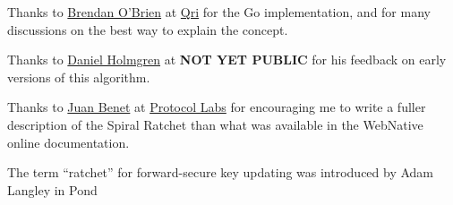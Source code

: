 \documentclass{article}
\begin{document}
    Thanks to \href{https://github.com/b5/}{Brendan O'Brien} at \href{https://qri.io/}{Qri} for the {Go implementation}\cite{go-wnfs-ratchet}, and for many discussions on the best way to explain the concept.
    
    Thanks to \href{https://github.com/dholms}{Daniel Holmgren} at \textbf{NOT YET PUBLIC} for his feedback on early versions of this algorithm.
    
    Thanks to \href{https://github.com/jbenet/}{Juan Benet} at \href{https://protocol.ai/}{Protocol Labs} for encouraging me to write a fuller description of the Spiral Ratchet than what was available in the WebNative online documentation.
    
    The term “ratchet” for forward-secure key updating was introduced by Adam Langley in Pond\cite{pond}
    
    \printbibliography[title={References}]
\end{document}
